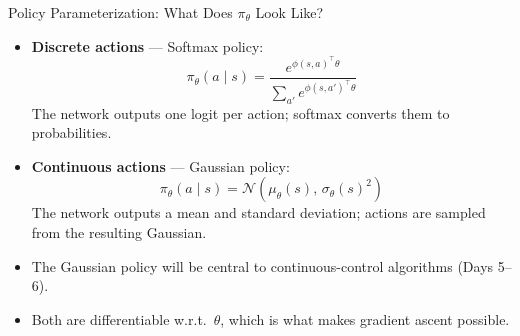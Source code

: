 \begin{frame}{Policy Parameterization: What Does $\pi_\theta$ Look Like?}
    \begin{itemize}
        \item \textbf{Discrete actions} --- Softmax policy:
        \[
            \pi_\theta(a \mid s) = \frac{e^{\phi(s,a)^\top \theta}}{\sum_{a'} e^{\phi(s,a')^\top \theta}}
        \]
        The network outputs one logit per action; softmax converts them to probabilities.
        \pause
        \item \textbf{Continuous actions} --- Gaussian policy:
        \[
            \pi_\theta(a \mid s) = \mathcal{N}\!\left(\mu_\theta(s),\, \sigma_\theta(s)^2\right)
        \]
        The network outputs a mean and standard deviation; actions are sampled from the resulting Gaussian.
        \pause
        \item The Gaussian policy will be central to continuous-control algorithms (Days 5--6).
        \item Both are differentiable w.r.t.\ $\theta$, which is what makes gradient ascent possible.
    \end{itemize}
\end{frame}
